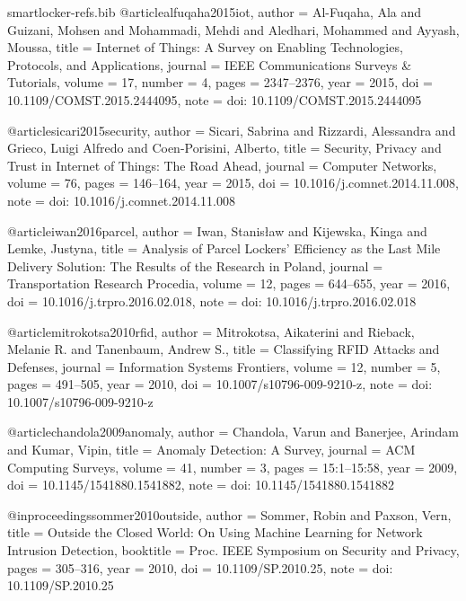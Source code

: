 \begin{filecontents*}[overwrite]{smartlocker-refs.bib}
@article{alfuqaha2015iot,
  author  = {Al-Fuqaha, Ala and Guizani, Mohsen and Mohammadi, Mehdi and Aledhari, Mohammed and Ayyash, Moussa},
  title   = {Internet of Things: A Survey on Enabling Technologies, Protocols, and Applications},
  journal = {IEEE Communications Surveys \& Tutorials},
  volume  = {17},
  number  = {4},
  pages   = {2347--2376},
  year    = {2015},
  doi     = {10.1109/COMST.2015.2444095},
  note    = {doi: 10.1109/COMST.2015.2444095}
}

@article{sicari2015security,
  author  = {Sicari, Sabrina and Rizzardi, Alessandra and Grieco, Luigi Alfredo and Coen-Porisini, Alberto},
  title   = {Security, Privacy and Trust in {Internet of Things}: The Road Ahead},
  journal = {Computer Networks},
  volume  = {76},
  pages   = {146--164},
  year    = {2015},
  doi     = {10.1016/j.comnet.2014.11.008},
  note    = {doi: 10.1016/j.comnet.2014.11.008}
}

@article{iwan2016parcel,
  author  = {Iwan, Stanis{\l}aw and Kijewska, Kinga and Lemke, Justyna},
  title   = {Analysis of Parcel Lockers' Efficiency as the Last Mile Delivery Solution: The Results of the Research in {Poland}},
  journal = {Transportation Research Procedia},
  volume  = {12},
  pages   = {644--655},
  year    = {2016},
  doi     = {10.1016/j.trpro.2016.02.018},
  note    = {doi: 10.1016/j.trpro.2016.02.018}
}

@article{mitrokotsa2010rfid,
  author  = {Mitrokotsa, Aikaterini and Rieback, Melanie R. and Tanenbaum, Andrew S.},
  title   = {Classifying {RFID} Attacks and Defenses},
  journal = {Information Systems Frontiers},
  volume  = {12},
  number  = {5},
  pages   = {491--505},
  year    = {2010},
  doi     = {10.1007/s10796-009-9210-z},
  note    = {doi: 10.1007/s10796-009-9210-z}
}

@article{chandola2009anomaly,
  author  = {Chandola, Varun and Banerjee, Arindam and Kumar, Vipin},
  title   = {Anomaly Detection: A Survey},
  journal = {ACM Computing Surveys},
  volume  = {41},
  number  = {3},
  pages   = {15:1--15:58},
  year    = {2009},
  doi     = {10.1145/1541880.1541882},
  note    = {doi: 10.1145/1541880.1541882}
}

@inproceedings{sommer2010outside,
  author    = {Sommer, Robin and Paxson, Vern},
  title     = {Outside the Closed World: On Using Machine Learning for Network Intrusion Detection},
  booktitle = {Proc. IEEE Symposium on Security and Privacy},
  pages     = {305--316},
  year      = {2010},
  doi       = {10.1109/SP.2010.25},
  note      = {doi: 10.1109/SP.2010.25}
}


\end{filecontents*}
